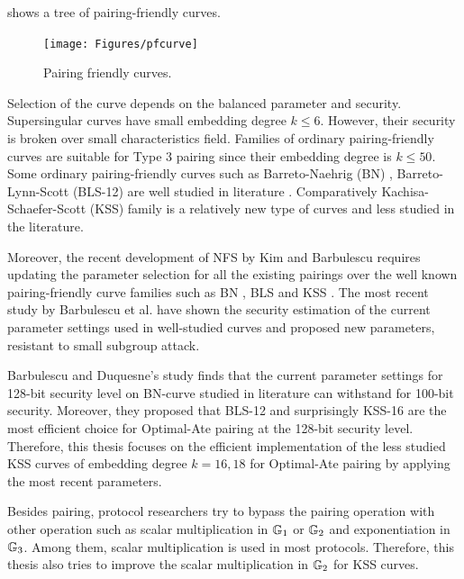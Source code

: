  shows a tree of pairing-friendly curves.
\begin{figure}
	\centering
	\texttt{[image: Figures/pfcurve]}
	\caption{Pairing friendly curves.}
	\label{fig:ch:intro:pfcurve}
\end{figure}

Selection of the curve depends on the balanced parameter and security.
Supersingular curves have small embedding degree $k\leq 6$.
However, their security is broken over small characteristics field.
Families of ordinary pairing-friendly curves are suitable for Type 3 pairing since their embedding degree is $k\leq 50$. 
Some ordinary pairing-friendly curves such as Barreto-Naehrig (BN) \cite{SAC:BarNae05} , Barreto-Lynn-Scott (BLS-12) \cite{SCN:BarLynSco02}  are well studied in literature \cite{DBLP:journals/ieicet/NogamiSONAM09} \cite{CANS:SNOKM08}.
Comparatively Kachisa-Schaefer-Scott (KSS) \cite{EPRINT:KacSchSco07} family is a relatively new type of curves and less studied in the literature.

Moreover, the recent development of NFS by Kim and Barbulescu \cite{C:KimBar16} requires updating the parameter selection for all the existing pairings over the well known pairing-friendly curve families such as BN \cite{SAC:BarNae05}, BLS \cite{EPRINT:FreScoTes06} and KSS \cite{EPRINT:KacSchSco07}.
The most recent study by Barbulescu et al. \cite{EPRINT:BarDuq17} have shown the security estimation of the current parameter settings used in well-studied curves and proposed new parameters, resistant to small subgroup attack.

Barbulescu and Duquesne's study finds that the current parameter settings for 128-bit security level on BN-curve studied in literature can withstand for 100-bit security. 
Moreover, they proposed that BLS-12 and surprisingly KSS-16 are the most efficient choice for Optimal-Ate pairing at the 128-bit security level. 
Therefore, this thesis focuses on the efficient implementation of the less studied KSS curves of embedding degree $k=16, 18$ for Optimal-Ate pairing by applying the most recent parameters.

Besides pairing, protocol researchers try to bypass the pairing operation with other operation such as scalar multiplication in ${\mathbb{G}}_{1}$ or ${\mathbb{G}}_{2}$ and exponentiation in ${\mathbb{G}}_{3}$.
Among them, scalar multiplication is used in most protocols.
Therefore, this thesis also tries to improve the scalar multiplication in ${\mathbb{G}}_{2}$ for KSS curves. 


